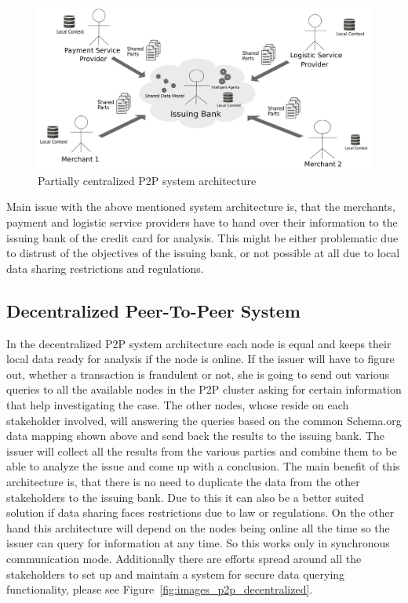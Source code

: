 \begin{figure}[H]
	\centering
		\includegraphics[width=0.8\columnwidth]{images/system_P2P_centralized.pdf}
	\caption{Partially centralized P2P system architecture}
\label{fig:images_p2p_centralized}
\end{figure}

Main issue with the above mentioned system architecture is, that the merchants, payment and logistic service providers have to hand over their information to the issuing bank of the credit card for analysis. This might be either problematic due to distrust of the objectives of the issuing bank, or not possible at all due to local data sharing restrictions and regulations.


\subsection{Decentralized Peer-To-Peer System}
\label{subsec:p2p_decentralized_system}

In the decentralized P2P system architecture each node is equal and keeps their local data ready for analysis if the node is online. If the issuer will have to figure out, whether a transaction is fraudulent or not, she is going to send out various queries to all the available nodes in the P2P cluster asking for certain information that help investigating the case. The other nodes, whose reside on each stakeholder involved, will answering the queries based on the common Schema.org data mapping shown above and send back the results to the issuing bank. The issuer will collect all the results from the various parties and combine them to be able to analyze the issue and come up with a conclusion. The main benefit of this architecture is, that there is no need to duplicate the data from the other stakeholders to the issuing bank. Due to this it can also be a better suited solution if data sharing faces restrictions due to law or regulations. On the other hand this architecture will depend on the nodes being online all the time so the issuer can query for information at any time. So this works only in synchronous communication mode. Additionally there are efforts spread around all the stakeholders to set up and maintain a system for secure data querying functionality, please see Figure~\ref{fig:images_p2p_decentralized}.

